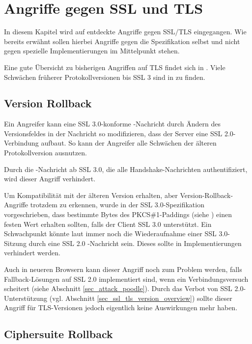 
\chapter{Angriffe gegen SSL und TLS}

\label{cha_attacks}

In diesem Kapitel wird auf entdeckte Angriffe gegen SSL/TLS eingegangen. Wie bereits erwähnt sollen hierbei Angriffe gegen die Spezifikation selbst und nicht gegen spezielle Implementierungen im Mittelpunkt stehen. 
 
Eine gute Übersicht zu bisherigen Angriffen auf TLS findet sich in \cite{meyer13}. Viele Schwächen früherer Protokollversionen bis SSL 3 sind in \cite{wagner96} zu finden.

\section{Version Rollback}

\label{sec_version_rollback}

Ein Angreifer kann eine SSL 3.0-konforme \clienthello{}-Nachricht durch Ändern des Versionsfeldes in der Nachricht so modifizieren, dass der Server eine SSL 2.0-Verbindung aufbaut. So kann der Angreifer alle Schwächen der älteren Protokollversion ausnutzen. 

Durch die \finished{}-Nachricht ab SSL 3.0, die alle Handshake-Nachrichten authentifiziert, wird dieser Angriff verhindert.

Um Kompatibilität mit der älteren Version erhalten, aber Version-Rollback-Angriffe trotzdem zu erkennen, wurde in der SSL 3.0-Spezifikation \cite{ssl30} vorgeschrieben, dass bestimmte Bytes des PKCS\#1-Paddings (siehe \cite{pkcs1}) einen festen Wert erhalten sollten, falls der Client SSL 3.0 unterstützt. Ein Schwachpunkt könnte laut \cite{wagner96} immer noch die Wiederaufnahme einer SSL 3.0-Sitzung durch eine SSL 2.0 \clienthello{}-Nachricht sein. Dieses sollte in Implementierungen verhindert werden.

Auch in neueren Browsern kann dieser Angriff noch zum Problem werden, falls Fallback-Lösungen auf SSL 2.0 implementiert sind, wenn ein Verbindungsversuch scheitert (siehe Abschnitt \ref{sec_attack_poodle}). Durch das Verbot von SSL 2.0-Unterstützung (vgl. Abschnitt \ref{sec_ssl_tls_version_overview}) sollte dieser Angriff für TLS-Versionen jedoch eigentlich keine Auswirkungen mehr haben. 

\section{Ciphersuite Rollback}

